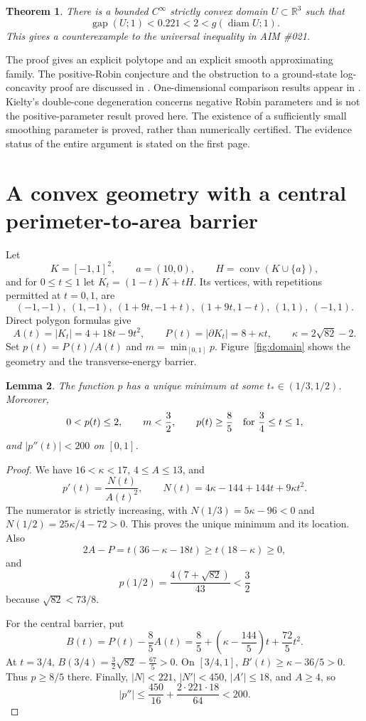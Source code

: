\documentclass[11pt,a4paper]{article}
\newtheorem{theorem}{Theorem}[section]
\newtheorem{lemma}[theorem]{Lemma}
\theoremstyle{remark}
\newcommand{\R}{\mathbb R}
\newcommand{\gap}{\operatorname{gap}}
\newcommand{\diam}{\operatorname{diam}}
\newcommand{\conv}{\operatorname{conv}}
\begin{document}
\begin{theorem}\label{thm:main}
There is a bounded $C^\infty$ strictly convex domain $U\subset\R^3$ such that
\[
 \gap(U;1)<0.221<2<g(\diam U;1).
\]
This gives a counterexample to the universal inequality in AIM \#021.
\end{theorem}

The proof gives an explicit polytope and an explicit smooth approximating family. The positive-Robin conjecture and the obstruction to a ground-state log-concavity proof are discussed in \cite{laugesen,andrews2020}. One-dimensional comparison results appear in \cite{andrews2021}. Kielty's double-cone degeneration \cite{kielty} concerns negative Robin parameters and is not the positive-parameter result proved here. The existence of a sufficiently small smoothing parameter is proved, rather than numerically certified. The evidence status of the entire argument is stated on the first page.

\section{A convex geometry with a central perimeter-to-area barrier}
Let
\[
 K=[-1,1]^2,\qquad a=(10,0),\qquad H=\conv(K\cup\{a\}),
\]
and for $0\le t\le1$ let $K_t=(1-t)K+tH$. Its vertices, with repetitions permitted at $t=0,1$, are
\[
 (-1,-1),\ (1,-1),\ (1+9t,-1+t),\ (1+9t,1-t),\ (1,1),\ (-1,1).
\]
Direct polygon formulas give
\begin{equation}\label{eq:AP}
 A(t)=|K_t|=4+18t-9t^2,\qquad
 P(t)=|\partial K_t|=8+\kappa t,\qquad
 \kappa=2\sqrt{82}-2.
\end{equation}
Set $p(t)=P(t)/A(t)$ and $m=\min_{[0,1]}p$. Figure~\ref{fig:domain} shows the geometry and the transverse-energy barrier.

\begin{lemma}\label{lem:barrier}
The function $p$ has a unique minimum at some $t_*\in(1/3,1/2)$. Moreover,
\[
 0<p(t)\le2,\qquad m<\frac32,\qquad
 p(t)\ge\frac85\quad\hbox{for }\frac34\le t\le1,
\]
and $|p''(t)|<200$ on $[0,1]$.
\end{lemma}
\begin{proof}
We have $16<\kappa<17$, $4\le A\le13$, and
\[
 p'(t)=\frac{N(t)}{A(t)^2},\qquad
 N(t)=4\kappa-144+144t+9\kappa t^2.
\]
The numerator is strictly increasing, with $N(1/3)=5\kappa-96<0$ and $N(1/2)=25\kappa/4-72>0$. This proves the unique minimum and its location. Also
\[
 2A-P=t(36-\kappa-18t)\ge t(18-\kappa)\ge0,
\]
and
\[
 p(1/2)=\frac{4(7+\sqrt{82})}{43}<\frac32
\]
because $\sqrt{82}<73/8$.

For the central barrier, put
\[
 B(t)=P(t)-\frac85A(t)
 =\frac85+\left(\kappa-\frac{144}{5}\right)t+\frac{72}{5}t^2.
\]
At $t=3/4$, $B(3/4)=\tfrac32\sqrt{82}-\tfrac{67}{5}>0$. On $[3/4,1]$,
$B'(t)\ge\kappa-36/5>0$. Thus $p\ge8/5$ there.
Finally, $|N|<221$, $|N'|<450$, $|A'|\le18$, and $A\ge4$, so
\[
 |p''|\le\frac{450}{16}+\frac{2\cdot221\cdot18}{64}<200.
\]
\end{proof}
\end{document}
